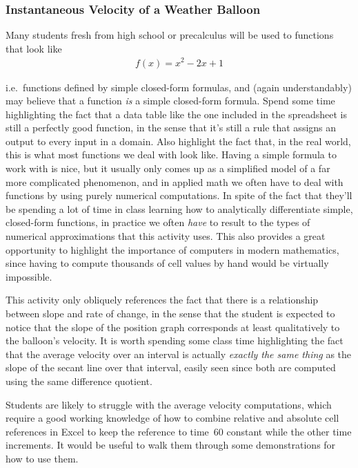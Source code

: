 \subsubsection*{Instantaneous Velocity of a Weather Balloon}

Many students fresh from high school or precalculus will be used to functions that look like
\begin{align*}
	f(x) = x^2 - 2x + 1
\end{align*}

i.e.~functions defined by simple closed-form formulas, and (again understandably) may believe that a function \textit{is} a simple closed-form formula. Spend some time highlighting the fact that a data table like the one included in the spreadsheet is still a perfectly good function, in the sense that it's still a rule that assigns an output to every input in a domain. Also highlight the fact that, in the real world, this is what most functions we deal with look like. Having a simple formula to work with is nice, but it usually only comes up as a simplified model of a far more complicated phenomenon, and in applied math we often have to deal with functions by using purely numerical computations. In spite of the fact that they'll be spending a lot of time in class learning how to analytically differentiate simple, closed-form functions, in practice we often \textit{have} to result to the types of numerical approximations that this activity uses. This also provides a great opportunity to highlight the importance of computers in modern mathematics, since having to compute thousands of cell values by hand would be virtually impossible.

This activity only obliquely references the fact that there is a relationship between slope and rate of change, in the sense that the student is expected to notice that the slope of the position graph corresponds at least qualitatively to the balloon's velocity. It is worth spending some class time highlighting the fact that the average velocity over an interval is actually \textit{exactly the same thing} as the slope of the secant line over that interval, easily seen since both are computed using the same difference quotient. %

Students are likely to struggle with the average velocity computations, which require a good working knowledge of how to combine relative and absolute cell references in Excel to keep the reference to time~60 constant while the other time increments. It would be useful to walk them through some demonstrations for how to use them.

